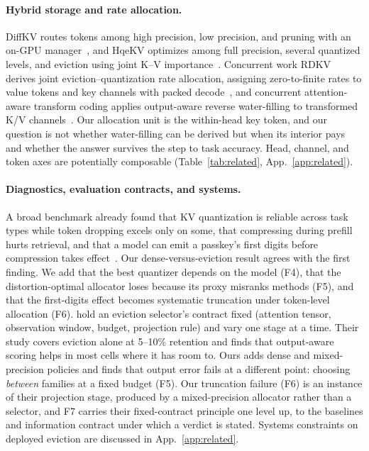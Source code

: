 \documentclass{article}
\theoremstyle{definition}
\begin{document}
\paragraph{Hybrid storage and rate allocation.}
DiffKV routes tokens among high precision, low precision, and pruning with an on-GPU manager~\citep{zhang2025diffkv}, and HqeKV optimizes among full precision, several quantized levels, and eviction using joint K--V importance~\citep{wang-etal-2026-hqekv}.  
Concurrent work RDKV derives joint eviction--quantization rate allocation, assigning zero-to-finite rates to value tokens and key channels with packed decode~\citep{zhang2026rdkv}, and concurrent attention-aware transform coding applies output-aware reverse water-filling to transformed K/V channels~\citep{laus2026aatc}.  
Our allocation unit is the within-head key token, and our question is not whether water-filling can be derived but when its interior pays and whether the answer survives the step to task accuracy.  Head, channel, and token axes are potentially composable (Table~\ref{tab:related}, App.~\ref{app:related}).

\paragraph{Diagnostics, evaluation contracts, and systems.}
A broad benchmark already found that KV quantization is reliable across task types while token dropping excels only on some, that compressing during prefill hurts retrieval, and that a model can emit a passkey's first digits before compression takes effect~\citep{yuan2024kvbench}.  
Our dense-versus-eviction result agrees with the first finding.  We add that the best quantizer depends on the model (F4), that the distortion-optimal allocator loses because its proxy misranks methods (F5), and that the first-digits effect becomes systematic truncation under token-level allocation (F6).
\citet{zhang2026fixedcontract} hold an eviction selector's contract fixed (attention tensor, observation window, budget, projection rule) and vary one stage at a time. %
Their study covers eviction alone at 5--10\% retention and finds that output-aware scoring helps in most cells where it has room to.  
Ours adds dense and mixed-precision policies and finds that output error fails at a different point: choosing \emph{between} families at a fixed budget (F5).  
Our truncation failure (F6) is an instance of their projection stage, produced by a mixed-precision allocator rather than a selector, and F7 carries their fixed-contract principle one level up, to the baselines and information contract under which a verdict is stated.
Systems constraints on deployed eviction are discussed in App.~\ref{app:related}.
\end{document}
